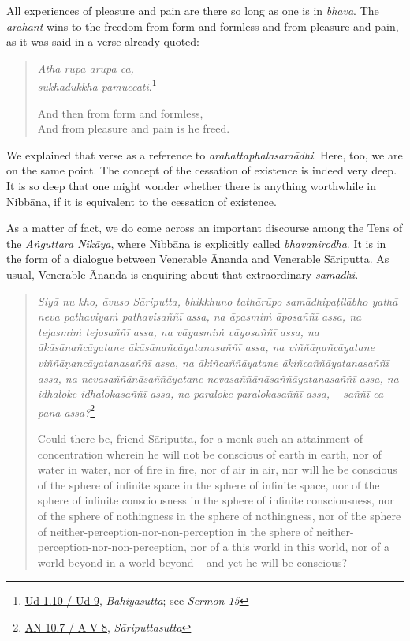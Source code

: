 All experiences of pleasure and pain are there so long as one is in \emph{bhava}. The \emph{arahant} wins to the freedom from form and formless and from pleasure and pain, as it was said in a verse already quoted:

\begin{quote}
\emph{Atha rūpā arūpā ca,}\\
\emph{sukhadukkhā pamuccati}.\footnote{\href{https://suttacentral.net/ud1.10/pli/ms}{Ud 1.10 / Ud 9}, \emph{Bāhiyasutta}; see \emph{Sermon 15}}

And then from form and formless,\\
And from pleasure and pain is he freed.
\end{quote}

We explained that verse as a reference to \emph{arahattaphalasamādhi}. Here, too, we are on the same point. The concept of the cessation of existence is indeed very deep. It is so deep that one might wonder whether there is anything worthwhile in Nibbāna, if it is equivalent to the cessation of existence.

As a matter of fact, we do come across an important discourse among the Tens of the \emph{Aṅguttara Nikāya}, where Nibbāna is explicitly called \emph{bhavanirodha}. It is in the form of a dialogue between Venerable Ānanda and Venerable Sāriputta. As usual, Venerable Ānanda is enquiring about that extraordinary \emph{samādhi}.

\begin{quote}
\emph{Siyā nu kho, āvuso Sāriputta, bhikkhuno tathārūpo samādhipaṭilābho yathā neva pathaviyaṁ pathavisaññī assa, na āpasmiṁ āposaññī assa, na tejasmiṁ tejosaññī assa, na vāyasmiṁ vāyosaññī assa, na ākāsānañcāyatane ākāsānañcāyatanasaññī assa, na viññāṇañcāyatane viññāṇancāyatanasaññī assa, na ākiñcaññāyatane ākiñcaññāyatanasaññī assa, na nevasaññānāsaññāyatane nevasaññānāsaññāyatanasaññī assa, na idhaloke idhalokasaññī assa, na paraloke paralokasaññī assa, -- saññī ca pana assa?}\footnote{\href{https://suttacentral.net/an10.7/pli/ms}{AN 10.7 / A V 8}, \emph{Sāriputtasutta}}

Could there be, friend Sāriputta, for a monk such an attainment of concentration wherein he will not be conscious of earth in earth, nor of water in water, nor of fire in fire, nor of air in air, nor will he be conscious of the sphere of infinite space in the sphere of infinite space, nor of the sphere of infinite consciousness in the sphere of infinite consciousness, nor of the sphere of nothingness in the sphere of nothingness, nor of the sphere of neither-perception-nor-non-perception in the sphere of neither-perception-nor-non-perception, nor of a this world in this world, nor of a world beyond in a world beyond -- and yet he will be conscious?
\end{quote}

